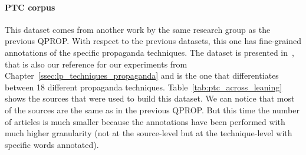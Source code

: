 \paragraph{PTC corpus}
This dataset comes from another work by the same research group as the previous QPROP.
With respect to the previous datasets, this one has fine-grained annotations of the specific propaganda techniques. The dataset is presented in~\citet{da2019fine}, that is also our reference for our experiments from Chapter~\ref{ssec:lp_techniques_propaganda} and is the one that differentiates between 18 different propaganda techniques.
Table~\ref{tab:ptc_across_leaning} shows the sources that were used to build this dataset. We can notice that most of the sources are the same as in the previous QPROP. But this time the number of articles is much smaller because the annotations have been performed with much higher granularity (not at the source-level but at the technique-level with specific words annotated).

